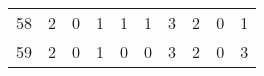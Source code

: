 \begin{longtable}{cp{1.5cm}p{1.5cm}p{1.5cm}p{1.5cm}p{1.5cm}p{1.5cm}p{1.5cm}p{1.5cm}p{1.5cm}}
58 &                      2 &                      0 &                      1 &                         1 &                         1 &                         3 &                      2 &                      0 &                      1 \\
59 &                      2 &                      0 &                      1 &                         0 &                         0 &                         3 &                      2 &                      0 &                      3 \\
\end{longtable}
